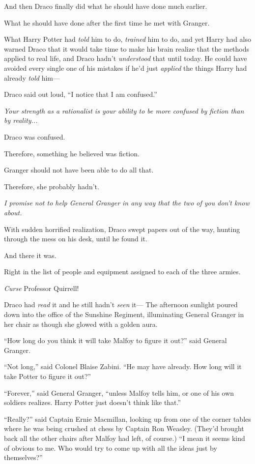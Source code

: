And then Draco finally did what he should have done much earlier.

What he should have done after the first time he met with Granger.

What Harry Potter had \emph{told} him to do, \emph{trained} him to do, and yet Harry had also warned Draco that it would take time to make his brain realize that the methods applied to real life, and Draco hadn’t \emph{understood} that until today. He could have avoided every single one of his mistakes if he’d just \emph{applied} the things Harry had already \emph{told} him—

Draco said out loud, “I notice that I am confused.”

\emph{Your strength as a rationalist is your ability to be more confused by fiction than by reality...}

Draco was confused.

Therefore, something he believed was fiction.

Granger should not have been able to do all that.

Therefore, she probably hadn’t.

\emph{I promise not to help General Granger in any way that the two of you don’t know about.}

With sudden horrified realization, Draco swept papers out of the way, hunting through the mess on his desk, until he found it.

And there it was.

Right in the list of people and equipment assigned to each of the three armies.

\emph{Curse} Professor Quirrell!

Draco had \emph{read} it and he still hadn’t \emph{seen} it—
\sbreak
The afternoon sunlight poured down into the office of the Sunshine Regiment, illuminating General Granger in her chair as though she glowed with a golden aura.

“How long do you think it will take Malfoy to figure it out?” said General Granger.

“Not long,” said Colonel Blaise Zabini. “He may have already. How long will it take Potter to figure it out?”

“Forever,” said General Granger, “unless Malfoy tells him, or one of his own soldiers realizes. Harry Potter just doesn’t think like that.”

“Really?” said Captain Ernie Macmillan, looking up from one of the corner tables where he was being crushed at chess by Captain Ron Weasley. (They’d brought back all the other chairs after Malfoy had left, of course.) “I mean it seems kind of obvious to me. Who would try to come up with all the ideas just by themselves?”

